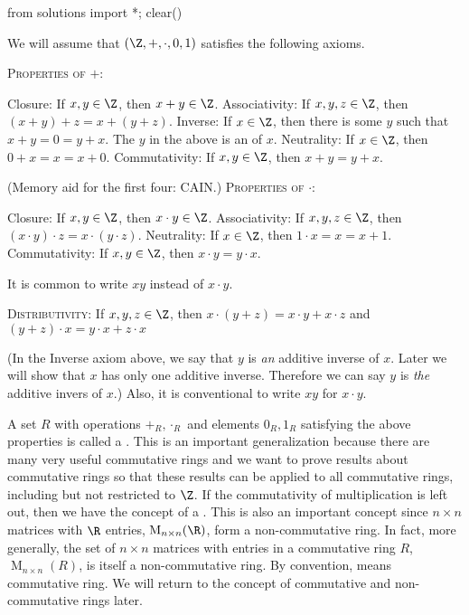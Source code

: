\begin{python0}
from solutions import *; clear()
\end{python0}

We will assume that $(\Z, +, \cdot, 0, 1)$ satisfies the following
axioms.
\begin{enumerate}[nosep]
  \li \textsc{Properties of $+$:}
  \begin{enumerate}[nosep]
    \li Closure: If $x, y \in \Z$, then $x + y \in \Z$.
    \li Associativity: If $x, y, z \in \Z$, then $(x + y) + z = x + (y + z)$.
    \li Inverse: If $x \in \Z$, then there is some $y$ such that $x + y = 0 = y + x$.
      The $y$ in the above is an  of $x$.
    \li Neutrality: If $x \in \Z$, then $0 + x = x = x + 0$.
    \li Commutativity: If $x, y \in \Z$, then $x + y = y + x$.
  \end{enumerate}
  (Memory aid for the first four: CAIN.)
  \li \textsc{Properties of $\cdot$:}
  \begin{enumerate}[nosep]
  \li Closure: If $x, y \in \Z$, then $x \cdot y \in \Z$.
  \li Associativity: If $x, y, z \in \Z$, then $(x \cdot y) \cdot z = x \cdot (y \cdot z)$.
  \li Neutrality: If $x \in \Z$, then $1 \cdot x = x = x + 1$.
  \li Commutativity: If $x, y \in \Z$, then $x \cdot y = y \cdot x$.
  \end{enumerate}
  It is common to write $xy$ instead of $x \cdot y$.

  \li \textsc{Distributivity}:
  If $x, y, z \in \Z$, then
  $x \cdot (y + z) = x \cdot y + x \cdot z$
  and
  $(y + z) \cdot x = y \cdot x + z \cdot x$
    
\end{enumerate}
(In the Inverse axiom above, we say that $y$ is \textit{an} additive inverse of
$x$.
Later we will show that $x$ has only one additive inverse.
Therefore we can say $y$ is \textit{the} additive invers of $x$.)
Also, it is conventional to write $xy$ for $x \cdot y$.

A set $R$ with operations $+_R, \cdot_R$ and elements $0_R, 1_R$ satisfying
the above properties is called a .
This is an important generalization because there are many
very useful commutative rings and we want to prove results about
commutative rings so that these results can be applied to all
commutative rings, including but not restricted to $\Z$.
If the commutativity of multiplication is left out, then we have the
concept of a .
This is also an important concept since $n \times n$ matrices with $\R$
entries, $\operatorname{M}_{n \times n}(\R)$, form a non-commutative ring.
In fact, more generally,
the set of $n\times n$ matrices with entries in a commutative ring $R$,
$\operatorname{M}_{n \times n}(R)$,
is itself a non-commutative ring.
By convention,  means commutative ring.
We will return to the concept of commutative and non-commutative rings later.

